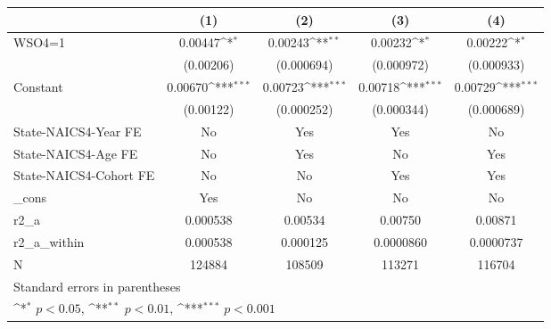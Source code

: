 {
\def\sym#1{\ifmmode^{#1}\else\(^{#1}\)\fi}
\begin{tabular}{l*{4}{c}}
\hline\hline
                    &\multicolumn{1}{c}{(1)}         &\multicolumn{1}{c}{(2)}         &\multicolumn{1}{c}{(3)}         &\multicolumn{1}{c}{(4)}         \\
\hline
WSO4=1              &     0.00447\sym{*}  &     0.00243\sym{**} &     0.00232\sym{*}  &     0.00222\sym{*}  \\
                    &   (0.00206)         &  (0.000694)         &  (0.000972)         &  (0.000933)         \\
[1em]
Constant            &     0.00670\sym{***}&     0.00723\sym{***}&     0.00718\sym{***}&     0.00729\sym{***}\\
                    &   (0.00122)         &  (0.000252)         &  (0.000344)         &  (0.000689)         \\
[1em]
State-NAICS4-Year FE&          No         &         Yes         &         Yes         &          No         \\
[1em]
State-NAICS4-Age FE &          No         &         Yes         &          No         &         Yes         \\
[1em]
State-NAICS4-Cohort FE&          No         &          No         &         Yes         &         Yes         \\
[1em]
\_cons              &         Yes         &          No         &          No         &          No         \\
\hline
r2\_a                &    0.000538         &     0.00534         &     0.00750         &     0.00871         \\
r2\_a\_within         &    0.000538         &    0.000125         &   0.0000860         &   0.0000737         \\
N                   &      124884         &      108509         &      113271         &      116704         \\
\hline\hline
\multicolumn{5}{l}{\footnotesize Standard errors in parentheses}\\
\multicolumn{5}{l}{\footnotesize \sym{*} \(p<0.05\), \sym{**} \(p<0.01\), \sym{***} \(p<0.001\)}\\
\end{tabular}
}
